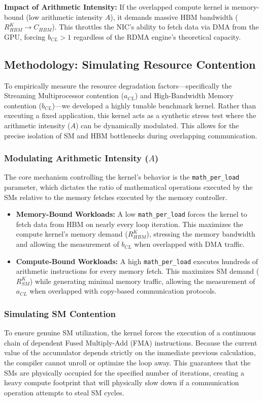 \documentclass[twocolumn, secnumarabic, amssymb, nobibnotes, aps, prd, amsmath, nofootinbib]{revtex4-2}
\begin{document}
\textbf{Impact of Arithmetic Intensity:} If the overlapped compute kernel is memory-bound (low arithmetic intensity $A$), it demands massive HBM bandwidth ($R_{HBM}^K \to C_{HBM}$). This throttles the NIC's ability to fetch data via DMA from the GPU, forcing $b_{CL} > 1$ regardless of the RDMA engine's theoretical capacity.

\subsection{Methodology: Simulating Resource Contention}

To empirically measure the resource degradation factors—specifically the Streaming Multiprocessor contention ($a_{CL}$) and High-Bandwidth Memory contention ($b_{CL}$)—we developed a highly tunable benchmark kernel. Rather than executing a fixed application, this kernel acts as a synthetic stress test where the arithmetic intensity ($A$) can be dynamically modulated. This allows for the precise isolation of SM and HBM bottlenecks during overlapping communication.

\subsubsection{Modulating Arithmetic Intensity ($A$)}
The core mechanism controlling the kernel's behavior is the \texttt{math\_per\_load} parameter, which dictates the ratio of mathematical operations executed by the SMs relative to the memory fetches executed by the memory controller.
\begin{itemize}
    \item \textbf{Memory-Bound Workloads:} A low \texttt{math\_per\_load} forces the kernel to fetch data from HBM on nearly every loop iteration. This maximizes the compute kernel's memory demand ($R_{HBM}^K$), stressing the memory bandwidth and allowing the measurement of $b_{CL}$ when overlapped with DMA traffic.
    \item \textbf{Compute-Bound Workloads:} A high \texttt{math\_per\_load} executes hundreds of arithmetic instructions for every memory fetch. This maximizes SM demand ($R_{SM}^K$) while generating minimal memory traffic, allowing the measurement of $a_{CL}$ when overlapped with copy-based communication protocols.
\end{itemize}

\subsubsection{Simulating SM Contention}
To ensure genuine SM utilization, the kernel forces the execution of a continuous chain of dependent Fused Multiply-Add (FMA) instructions. Because the current value of the accumulator depends strictly on the immediate previous calculation, the compiler cannot unroll or optimize the loop away. This guarantees that the SMs are physically occupied for the specified number of iterations, creating a heavy compute footprint that will physically slow down if a communication operation attempts to steal SM cycles.
\end{document}
